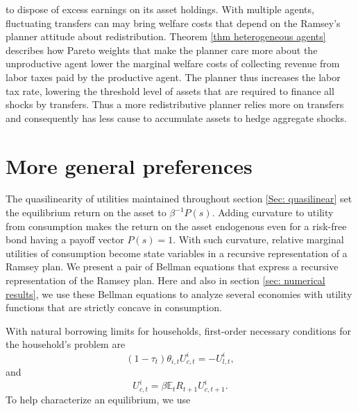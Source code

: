 \documentclass[thmsb,11pt]{article}
\begin{document}
to dispose of excess earnings on its asset holdings. With multiple agents, fluctuating transfers can may bring welfare costs that  depend on
the Ramsey's planner attitude about  redistribution. Theorem \ref{thm heterogeneous agents} describes how Pareto weights that  make the planner care more about the unproductive agent lower the marginal welfare costs of collecting revenue from labor taxes paid by the productive agent. The planner thus increases the labor tax rate, lowering the threshold level of assets that are required to finance all shocks by transfers. Thus a more redistributive planner relies more on transfers and consequently has less cause to accumulate assets to hedge aggregate shocks.

\color{black}

\section{More general preferences}
\label{Sec: more general economies}

The quasilinearity of utilities maintained throughout  section \ref{Sec: quasilinear} set  the equilibrium  return on the asset to $\beta^{-1}P(s)$.
Adding curvature to utility from consumption  makes the  return on the asset   endogenous even for a risk-free bond having a payoff vector $P(s)=1$.
With such curvature, relative marginal utilities of consumption become state variables in a recursive representation of a Ramsey plan.
We  present a pair of Bellman equations that express a recursive representation of the Ramsey plan. Here  and also in section  \ref{sec: numerical results}, we  use these Bellman equations to analyze
several economies  with utility functions that are strictly concave in consumption.

With natural borrowing limits for households, first-order necessary conditions for the  household's problem
 are%
\begin{equation}
\left( 1-\tau _{t}\right) \theta _{i,t}U_{c,t}^{i}=-U_{l,t}^{i},
\label{FOC consumption labor}
\end{equation}%
and%
\begin{equation}
U_{c,t}^{i}=\beta\mathbb{E}_{t}R_{t+1}U_{c,t+1}^{i}.  \label{FOC Euler}
\end{equation}%
To help characterize an equilibrium, we use
\end{document}

